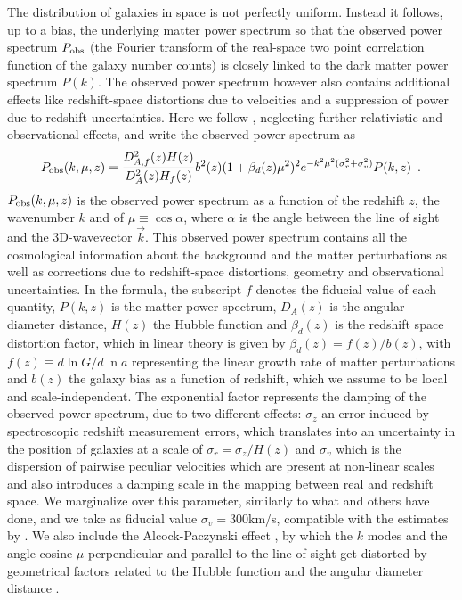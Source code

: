 The distribution of galaxies in space is not perfectly uniform. Instead it follows, up to a bias, the underlying
matter power spectrum so that the observed power spectrum $P_{\mathrm{obs}}$ (the Fourier transform of the real-space two point correlation
function of the galaxy number counts) is closely linked to the dark matter power spectrum $P(k)$. 
The observed power spectrum however also contains
additional effects like redshift-space distortions due to velocities and a suppression of power due to redshift-uncertainties. Here
we follow \cite{seo_improved_2007}, neglecting further relativistic and observational effects, and write the observed power spectrum as
\begin{equation}
P_{\mathrm{obs}} (k,\mu,z)=\frac{D_{A,f}^{2}(z)H(z)}{D_{A}^{2}(z)H_{f}(z)}b^{2}(z)(1+\beta_{d}(z)\mu^{2})^{2}e^{-k^{2}\mu^{2}(\sigma_{r}^{2}+\sigma_{v}^{2})}P(k,z)\,\,\,.\label{eq:observed-Pk}
\end{equation}
$P_{\mathrm{obs}} (k,\mu,z)$ is the observed power spectrum as a
function of the redshift $z$, the wavenumber $k$ and of $\mu\equiv\cos\alpha$,
where $\alpha$ is the angle between the line of sight and the 3D-wavevector
$\vec{k}$.
This observed power spectrum contains all the cosmological information
about the background and the matter perturbations as well as corrections
due to redshift-space distortions, geometry and observational uncertainties.
In the formula, the subscript $f$ denotes the fiducial value
of each quantity, $P(k,z)$ is the matter power spectrum, $D_{A}(z)$
is the angular diameter distance, $H(z)$ the Hubble function and
$\beta_{d}(z)$ is the redshift space distortion factor, which in
linear theory is given by $\beta_{d}(z)=f(z)/b(z)$, with $f(z)\equiv d\ln
G/d\ln a$
representing the linear growth rate of matter perturbations and $b(z)$ the galaxy bias as a function of redshift,
which we assume to be local and scale-independent. The exponential
factor represents the damping of the observed power spectrum, due
to two different effects: $\sigma_{z}$ an error induced by spectroscopic
redshift measurement errors, which translates into an uncertainty in the position of galaxies at a scale of
$\sigma_{r}=\sigma_{z}/H(z)$ and $\sigma_{v}$ which is the dispersion
of pairwise peculiar velocities which are present at non-linear scales
and also introduces a damping scale in the mapping between real and
redshift space. We marginalize over this parameter, similarly to what \cite{bull_extending_2015} and others have done, and we take as fiducial value $\sigma_{v} = 300$km/s, compatible with the estimates by \cite{de_la_torre_modelling_2012}. We also include the Alcock-Paczynski effect \cite{alcock_evolution_1979}, by which the $k$ modes and the angle cosine $\mu$ perpendicular and parallel to the line-of-sight get distorted by geometrical factors related to the Hubble function and the angular diameter distance \cite{ballinger_measuring_1996, feldman_power_1994}. 

